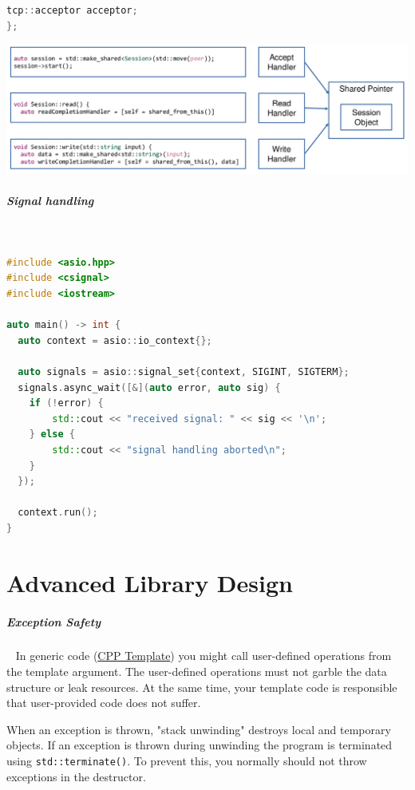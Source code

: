 \documentclass[11pt,twoside,landscape]{article}
\begin{document}
\begin{multicols}{2}
\begin{lstlisting}[language=c++,label=lst:async-example-using-asio,caption={Async Example using ASIO},captionpos=b,numbers=none]
  tcp::acceptor acceptor;
};
\end{lstlisting}


{
\begin{center}
\includegraphics[width=.9\linewidth]{img/asio_keep_session_alive.png}
\end{center}
\label{fig:keep-session-alive}
}
\subparagraph{Signal handling} \
\label{sec:org40ffa3c}
\begin{lstlisting}[language=c++,label=lst:example-for-signal-handling-using-asio,caption={Example for signal handling using ASIO},captionpos=b,numbers=none]
#include <asio.hpp>
#include <csignal>
#include <iostream>

auto main() -> int {
  auto context = asio::io_context{};

  auto signals = asio::signal_set{context, SIGINT, SIGTERM};
  signals.async_wait([&](auto error, auto sig) {
    if (!error) {
        std::cout << "received signal: " << sig << '\n';
    } else {
        std::cout << "signal handling aborted\n";
    }
  });

  context.run();
}
\end{lstlisting}

\section{Advanced Library Design}
\label{sec:orgd1030d0}
\subparagraph{Exception Safety} \
\label{sec:orgc7e8acf}
In generic code (\href{../../../roam/20230629084234-cpp_template.org}{CPP Template}) you might call user-defined operations from the template argument.
The user-defined operations must not garble the data structure or leak resources.
At the same time, your template code is responsible that user-provided code does not suffer.

When an exception is thrown, "stack unwinding" destroys local and temporary objects.
If an exception is thrown during unwinding the program is terminated using \texttt{std::terminate()}.
To prevent this, you normally should not throw exceptions in the destructor.


\end{multicols}
\end{document}
